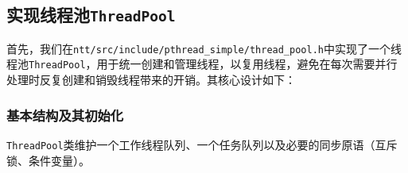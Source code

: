 \documentclass[a4paper]{article}
\begin{document}
\subsection{实现线程池\texttt{ThreadPool}}

首先，我们在\texttt{ntt/src/include/pthread\_simple/thread\_pool.h}中实现了一个线程池\texttt{ThreadPool}，用于统一创建和管理线程，以复用线程，避免在每次需要并行处理时反复创建和销毁线程带来的开销。其核心设计如下：

\subsubsection{基本结构及其初始化}

\texttt{ThreadPool}类维护一个工作线程队列、一个任务队列以及必要的同步原语（互斥锁、条件变量）。
\end{document}
